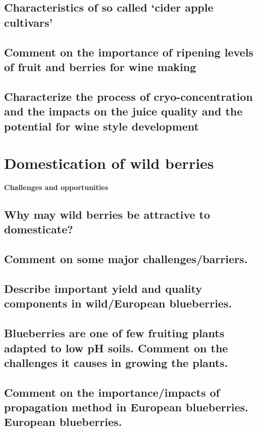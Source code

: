 \subsection{Characteristics of so called ‘cider apple cultivars’}
\subsection{Comment on the importance of ripening levels of fruit and berries for wine making}
\subsection{Characterize the process of cryo-concentration and the impacts on the juice quality and the potential for wine style development}


\vspace{1em}
\section{Domestication of wild berries} 
\textbf{Challenges and opportunities}

\subsection{Why may wild berries be attractive to domesticate?}
\subsection{Comment on some major challenges/barriers.}
\subsection{Describe important yield and quality components in wild/European blueberries.}
\subsection{Blueberries are one of few fruiting plants adapted to low pH soils. Comment on the challenges it causes in growing the plants.}
\subsection{Comment on the importance/impacts of propagation method in European blueberries. European blueberries.}

